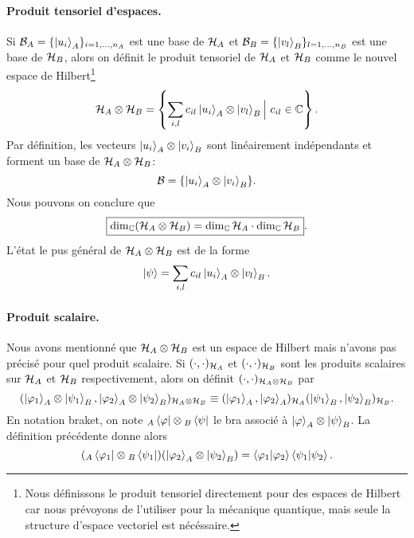 \documentclass[11pt,a4paper,oneside]{article}
\begin{document}
\paragraph*{Produit tensoriel d'espaces.} Si $\mathcal{B}_A=\{\ket{u_i}_A\}_{i=1,\dots,n_A}$ est une base de $\mathcal{H}_A$ et $\mathcal{B}_B=\{\ket{v_l}_B\}_{l=1,\dots,n_B}$ est une base de $\mathcal{H}_B$, alors on définit le produit tensoriel de $\mathcal{H}_A$ et $\mathcal{H}_B$ comme le nouvel espace de Hilbert\footnote{Nous définissons le produit tensoriel directement pour des espaces de Hilbert car nous prévoyons de l'utiliser pour la mécanique quantique, mais seule la structure d'espace vectoriel est nécéssaire.}
\begin{equation}
    \mathcal{H}_A\otimes\mathcal{H}_B = \left\{ \sum_{i,l} c_{il}\ket{u_i}_A\otimes\ket{v_l}_B \Big|~ c_{il}\in\mathbb{C} \right\}.
\end{equation}
Par définition, les vecteurs $\ket{u_i}_A\otimes\ket{v_i}_B$ sont linéairement indépendants et forment un base de $\mathcal{H}_A\otimes\mathcal{H}_B$:
\begin{equation}
    \mathcal{B} = \{\ket{u_i}_A\otimes\ket{v_i}_B\}.
\end{equation}
Nous pouvons on conclure que
\begin{equation}
    \boxed{\dim_{\mathbb{C}}(\mathcal{H}_A\otimes\mathcal{H}_B)=\dim_{\mathbb{C}}\mathcal{H}_A\cdot\dim_{\mathbb{C}}\mathcal{H}_B}.
\end{equation}
L'état le pus général de $\mathcal{H}_A\otimes\mathcal{H}_B$ est de la forme
\begin{equation}
    \ket{\psi}=\sum_{i,l} c_{il}\ket{u_i}_A\otimes\ket{v_l}_B.
\end{equation}

\paragraph*{Produit scalaire.} Nous avons mentionné que $\mathcal{H}_A\otimes\mathcal{H}_B$ est un espace de Hilbert mais n'avons pas précisé pour quel produit scalaire. Si $(\cdot,\cdot)_{\mathcal{H}_A}$ et $(\cdot,\cdot)_{\mathcal{H}_B}$ sont les produits scalaires sur $\mathcal{H}_A$ et $\mathcal{H}_B$ respectivement, alors on définit $(\cdot,\cdot)_{\mathcal{H}_A\otimes\mathcal{H}_B}$ par
\begin{equation}
    (\ket{\varphi_1}_A\otimes\ket{\psi_1}_B,\ket{\varphi_2}_A\otimes\ket{\psi_2}_B)_{\mathcal{H}_A\otimes\mathcal{H}_B} \equiv (\ket{\varphi_1}_A,\ket{\varphi_2}_A)_{\mathcal{H}_A}(\ket{\psi_1}_B,\ket{\psi_2}_B)_{\mathcal{H}_B}.
\end{equation}
En notation braket, on note ${_A}\bra{\varphi}\otimes{_B}\bra{\psi}$ le bra associé à $\ket{\varphi}_A\otimes\ket{\psi}_B$. La définition précédente donne alors
\begin{equation}
    ({_A}\bra{\varphi_1}\otimes{_B}\bra{\psi_1})(\ket{\varphi_2}_A\otimes\ket{\psi_2}_B) = \braket{\varphi_1}{\varphi_2}\braket{\psi_1}{\psi_2}.
\end{equation}
\end{document}
